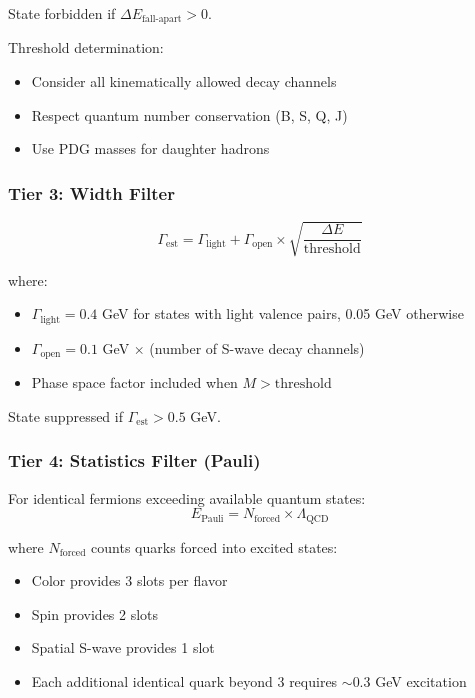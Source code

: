 \documentclass[12pt,a4paper]{article}
\begin{document}
State forbidden if $\Delta E_{\text{fall-apart}} > 0$.

Threshold determination:
\begin{itemize}
\item Consider all kinematically allowed decay channels
\item Respect quantum number conservation (B, S, Q, J)
\item Use PDG masses for daughter hadrons
\end{itemize}

\subsubsection{Tier 3: Width Filter}

\begin{equation}
\Gamma_{\text{est}} = \Gamma_{\text{light}} + \Gamma_{\text{open}} \times \sqrt{\frac{\Delta E}{\text{threshold}}}
\end{equation}

where:
\begin{itemize}
\item $\Gamma_{\text{light}} = 0.4$ GeV for states with light valence pairs, 0.05 GeV otherwise
\item $\Gamma_{\text{open}} = 0.1$ GeV $\times$ (number of S-wave decay channels)
\item Phase space factor included when $M > \text{threshold}$
\end{itemize}

State suppressed if $\Gamma_{\text{est}} > 0.5$ GeV.

\subsubsection{Tier 4: Statistics Filter (Pauli)}

For identical fermions exceeding available quantum states:
\begin{equation}
E_{\text{Pauli}} = N_{\text{forced}} \times \Lambda_{\text{QCD}}
\end{equation}

where $N_{\text{forced}}$ counts quarks forced into excited states:
\begin{itemize}
\item Color provides 3 slots per flavor
\item Spin provides 2 slots  
\item Spatial S-wave provides 1 slot
\item Each additional identical quark beyond 3 requires $\sim 0.3$ GeV excitation
\end{itemize}
\end{document}

